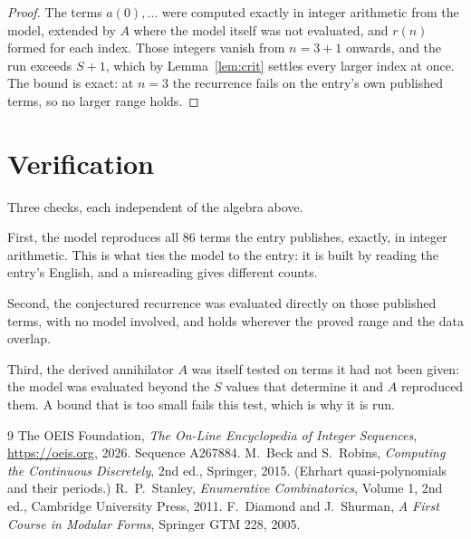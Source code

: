 \documentclass[11pt,a4paper]{article}
\theoremstyle{plain}
\theoremstyle{definition}
\begin{document}
\begin{proof}
The terms $a(0),\dots$ were computed exactly in integer arithmetic from the model, extended by
$A$ where the model itself was not evaluated, and $r(n)$ formed for each index. Those integers
vanish from $n=3+1$ onwards, and the run exceeds $S+1$, which by
Lemma~\ref{lem:crit} settles every larger index at once. The bound is exact: at $n=3$ the recurrence fails on the entry's own published terms, so no larger range holds.
\end{proof}

\section{Verification}

Three checks, each independent of the algebra above.

First, the model reproduces all $86$ terms the entry publishes, exactly, in integer
arithmetic. This is what ties the model to the entry: it is built by reading the entry's
English, and a misreading gives different counts.

Second, the conjectured recurrence was evaluated directly on those published terms, with no
model involved, and holds wherever the proved range and the data overlap.

Third, the derived annihilator $A$ was itself tested on terms it had not been given: the model
was evaluated beyond the $S$ values that determine it and $A$ reproduced them. A bound that is
too small fails this test, which is why it is run.

\begin{thebibliography}{9}
 The OEIS Foundation, \emph{The On-Line Encyclopedia of Integer
Sequences}, \url{https://oeis.org}, 2026. Sequence A267884.
 M.~Beck and S.~Robins, \emph{Computing the Continuous Discretely},
2nd ed., Springer, 2015. (Ehrhart quasi-polynomials and their periods.)
 R.~P.~Stanley, \emph{Enumerative Combinatorics}, Volume 1, 2nd ed.,
Cambridge University Press, 2011.
 F.~Diamond and J.~Shurman, \emph{A First Course in Modular Forms},
Springer GTM 228, 2005.
\end{thebibliography}
\end{document}
